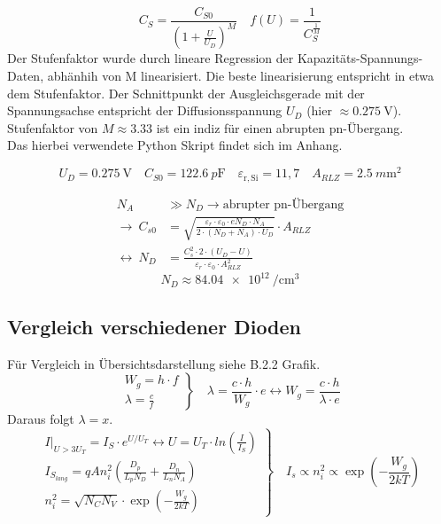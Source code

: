 \documentclass[
	a4paper, %
	12pt, %
]{CSUniSchoolLabReport}
\newcommand{\pico}{p}
\newcommand{\milli}{m}
\begin{document}
\[
C_S = \frac{C_{S0}}{(1+\frac{U}{U_D})^M}\quad f(U) = \frac{1}{C_S^\frac{1}{M}}
\]
Der Stufenfaktor wurde durch lineare Regression der Kapazitäts-Spannungs-Daten, abhänhih von M linearisiert. Die beste linearisierung entspricht in etwa dem Stufenfaktor. 
Der Schnittpunkt der Ausgleichsgerade mit der Spannungsachse entspricht der Diffusionsspannung $U_D$ (hier $\approx \SI{0.275}{\volt}$).
Stufenfaktor von $M \approx 3.33$ ist ein indiz für einen abrupten pn-Übergang. \\
Das hierbei verwendete Python Skript findet sich im Anhang.



\[
U_D = \SI{0.275}{\volt} \quad C_{S0} = \SI{122,6}{\pico\farad} \quad \varepsilon_{\mathrm{r,Si}} = 11{,}7 \quad A_{RLZ} = \SI{2.5}{\milli\metre\squared}
\]

\begin{align*}
N_A &\gg N_D \rightarrow \text{abrupter pn-Übergang} \\
\rightarrow\ C_{s0} &= \sqrt{\frac{\varepsilon_r \cdot \varepsilon_0 \cdot e N_D \cdot N_A}{2 \cdot (N_D + N_A) \cdot U_D}} \cdot A_{RLZ} \\
\leftrightarrow\ N_D &= \frac{C_s^2 \cdot 2 \cdot (U_D - U)}{\varepsilon_r \cdot \varepsilon_0 \cdot A_{RLZ}^2}
\end{align*}
\[
N_D \approx \SI{84.04e12}{\per\centi\meter\cubed}
\]
\vspace{1em} 

\subsection{Vergleich verschiedener Dioden}
Für Vergleich in Übersichtsdarstellung siehe B.2.2 Grafik.
\[
\left.
\begin{array}{l}
W_g = h \cdot f \\
\lambda = \frac{c}{f}
\end{array}
\right\}
\quad \lambda = \frac{c\cdot h}{W_g} \cdot e \leftrightarrow W_g = \frac{c \cdot h}{\lambda \cdot e}
\]
Daraus folgt $\lambda = x$. \\

\[
\left.
\begin{array}{l}
I|_{U>3U_T} = I_S\cdot e^{U/U_T} \leftrightarrow U = U_T\cdot ln(\frac{I}{I_S}) \\
I_{S_{lang}} = q A n_i^2 \left( \frac{D_p}{L_p N_D} + \frac{D_n}{L_n N_A} \right) \\
n_i^2 = \sqrt{N_C N_V} \cdot \exp\left(-\frac{W_g}{2kT}\right)
\end{array}
\right\}
\quad I_s \varpropto n_i^2 \varpropto \exp\left(-\frac{W_g}{2kT}\right)
\]
\end{document}
